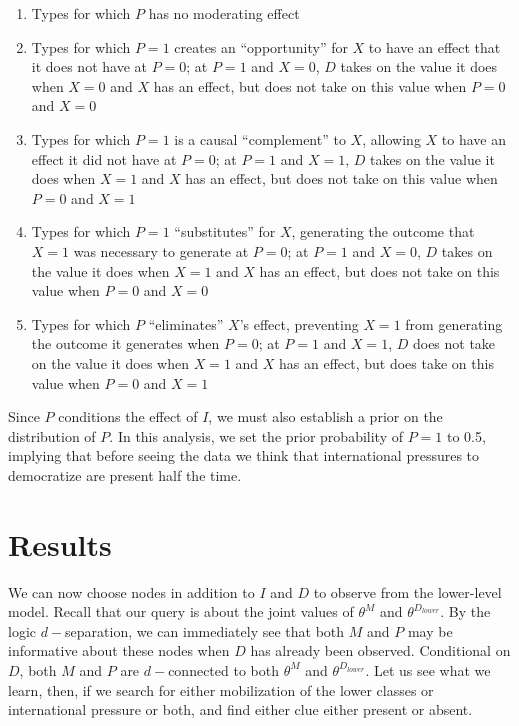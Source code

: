 \documentclass[
  12pt,
]{book}
\begin{document}
\begin{enumerate}
\def\labelenumi{\arabic{enumi}.}
\item
  Types for which \(P\) has no moderating effect
\item
  Types for which \(P=1\) creates an ``opportunity'' for \(X\) to have an effect that it does not have at \(P=0\); at \(P=1\) and \(X=0\), \(D\) takes on the value it does when \(X=0\) and \(X\) has an effect, but does not take on this value when \(P=0\) and \(X=0\)
\item
  Types for which \(P=1\) is a causal ``complement'' to \(X\), allowing \(X\) to have an effect it did not have at \(P=0\); at \(P=1\) and \(X=1\), \(D\) takes on the value it does when \(X=1\) and \(X\) has an effect, but does not take on this value when \(P=0\) and \(X=1\)
\item
  Types for which \(P=1\) ``substitutes'' for \(X\), generating the outcome that \(X=1\) was necessary to generate at \(P=0\); at \(P=1\) and \(X=0\), \(D\) takes on the value it does when \(X=1\) and \(X\) has an effect, but does not take on this value when \(P=0\) and \(X=0\)
\item
  Types for which \(P\) ``eliminates'' \(X\)'s effect, preventing \(X=1\) from generating the outcome it generates when \(P=0\); at \(P=1\) and \(X=1\), \(D\) does not take on the value it does when \(X=1\) and \(X\) has an effect, but does take on this value when \(P=0\) and \(X=1\)
\end{enumerate}

Since \(P\) conditions the effect of \(I\), we must also establish a prior on the distribution of \(P\). In this analysis, we set the prior probability of \(P=1\) to 0.5, implying that before seeing the data we think that international pressures to democratize are present half the time.

\hypertarget{results}{%
\section{Results}\label{results}}

We can now choose nodes in addition to \(I\) and \(D\) to observe from the lower-level model. Recall that our query is about the joint values of \(\theta^M\) and \(\theta^{D_{lower}}\). By the logic \(d-\)separation, we can immediately see that both \(M\) and \(P\) may be informative about these nodes when \(D\) has already been observed. Conditional on \(D\), both \(M\) and \(P\) are \(d-\)connected to both \(\theta^M\) and \(\theta^{D_{lower}}\). Let us see what we learn, then, if we search for either mobilization of the lower classes or international pressure or both, and find either clue either present or absent.
\end{document}
